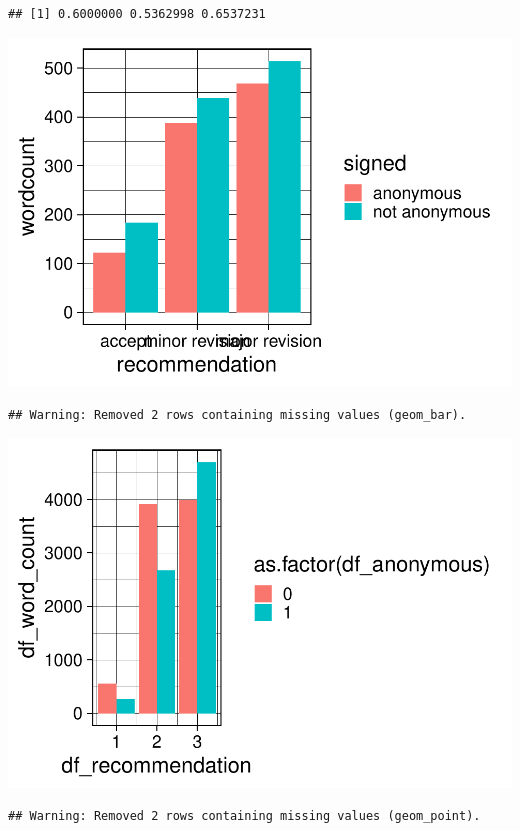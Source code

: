 \documentclass[,jou, a4paper,floatsintext]{apa6}
\begin{document}
\begin{verbatim}
## [1] 0.6000000 0.5362998 0.6537231
\end{verbatim}

\includegraphics{open_peer_review_files/figure-latex/unnamed-chunk-3-1.pdf}

\begin{verbatim}
## Warning: Removed 2 rows containing missing values (geom_bar).
\end{verbatim}

\includegraphics{open_peer_review_files/figure-latex/unnamed-chunk-3-2.pdf}

\begin{verbatim}
## Warning: Removed 2 rows containing missing values (geom_point).
\end{verbatim}
\end{document}
